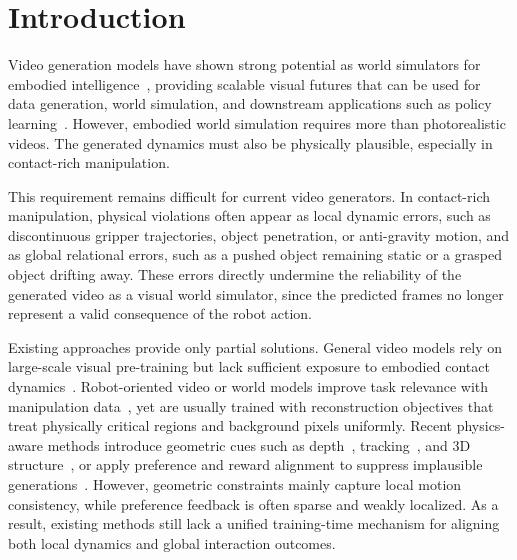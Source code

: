 \documentclass{llmxive}
\begin{document}
\section{Introduction}

Video generation models have shown strong potential as world simulators for embodied intelligence~\cite{openai2024sora,GoogleDeepMind2025Veo3,wan2025wan,kong2024hunyuanvideo,yang2024cogvideox}, providing scalable visual futures that can be used for data generation, world simulation, and downstream applications such as policy learning~\cite{bruce2024genie,o2024open,nvidia2026worldsimulationvideofoundation,ye2026worldactionmodelszeroshot,li2025unified,liang2025video, lingbot-va2026}. However, embodied world simulation requires more than photorealistic videos. The generated dynamics must also be physically plausible, especially in contact-rich manipulation.

This requirement remains difficult for current video generators. In contact-rich manipulation, physical violations often appear as local dynamic errors, such as discontinuous gripper trajectories, object penetration, or anti-gravity motion, and as global relational errors, such as a pushed object remaining static or a grasped object drifting away. These errors directly undermine the reliability of the generated video as a visual world simulator, since the predicted frames no longer represent a valid consequence of the robot action.

Existing approaches provide only partial solutions. General video models rely on large-scale visual pre-training but lack sufficient exposure to embodied contact dynamics~\cite{GoogleDeepMind2025Veo3,wan2025wan,kong2024hunyuanvideo,yang2024cogvideox}. Robot-oriented video or world models improve task relevance with manipulation data~\cite{jang2025dreamgen,feng2025vidar,cheang2024gr,du2023learning, chen2025lvp}, yet are usually trained with reconstruction objectives that treat physically critical regions and background pixels uniformly. Recent physics-aware methods introduce geometric cues such as depth~\cite{yang2024depth, video_depth_anything}, tracking~\cite{karaev2023cotracker,karaev24cotracker3,harley2025alltracker}, and 3D structure~\cite{zhen2025tesseract,shang2025roboscape,zhou2024robodreamer,guo2025ctrl}, or apply preference and reward alignment to suppress implausible generations~\cite{ouyang2022training,rafailov2024direct,ali2025abot,zhang2026mind}. However, geometric constraints mainly capture local motion consistency, while preference feedback is often sparse and weakly localized. As a result, existing methods still lack a unified training-time mechanism for aligning both local dynamics and global interaction outcomes.
\end{document}
